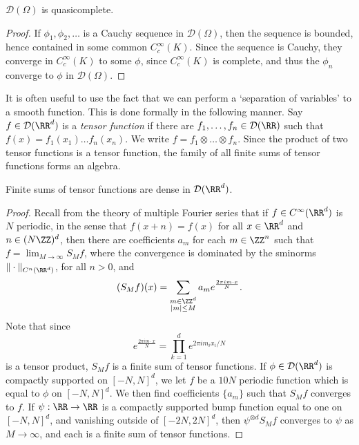\begin{corollary}
    $\mathcal{D}(\Omega)$ is quasicomplete.
\end{corollary}
\begin{proof}
    If $\phi_1, \phi_2, \dots$ is a Cauchy sequence in $\mathcal{D}(\Omega)$, then the sequence is bounded, hence contained in some common $C_c^\infty(K)$. Since the sequence is Cauchy, they converge in $C_c^\infty(K)$ to some $\phi$, since $C_c^\infty(K)$ is complete, and thus the $\phi_n$ converge to $\phi$ in $\mathcal{D}(\Omega)$.
\end{proof}

It is often useful to use the fact that we can perform a `separation of variables' to a smooth function. This is done formally in the following manner. Say $f \in \mathcal{D}(\RR^d)$ is a {\it tensor function} if there are $f_1, \dots, f_n \in \mathcal{D}(\RR)$ such that $f(x) = f_1(x_1) \dots f_n(x_n)$. We write $f = f_1 \otimes \dots \otimes f_n$. Since the product of two tensor functions is a tensor function, the family of all finite sums of tensor functions forms an algebra.

\begin{theorem}
    Finite sums of tensor functions are dense in $\mathcal{D}(\RR^d)$.
\end{theorem}
\begin{proof}
    Recall from the theory of multiple Fourier series that if $f \in C^\infty(\RR^d)$ is $N$ periodic, in the sense that $f(x + n) = f(x)$ for all $x \in \RR^d$ and $n \in (N \ZZ)^d$, then there are coefficients $a_m$ for each $m \in \ZZ^n$ such that $f = \lim_{M \to \infty} S_M f$, where the convergence is dominated by the sminorms $\| \cdot \|_{C^n(\RR^d)}$, for all $n > 0$, and
    \[ (S_M f)(x) = \sum_{\substack{m \in \ZZ^d\\|m| \leq M}} a_m e^{\frac{2 \pi i m \cdot x}{N}}. \]
    Note that since
    \[ e^{\frac{2 \pi i m \cdot x}{N}} = \prod_{k = 1}^d e^{2 \pi i m_ix_i/N} \]
    is a tensor product, $S_M f$ is a finite sum of tensor functions. If $\phi \in \mathcal{D}(\RR^d)$ is compactly supported on $[-N,N]^d$, we let $f$ be a $10N$ periodic function which is equal to $\phi$ on $[-N,N]^d$. We then find coefficients $\{ a_m \}$ such that $S_M f$ converges to $f$. If $\psi: \RR \to \RR$ is a compactly supported bump function equal to one on $[-N,N]^d$, and vanishing outside of $[-2N,2N]^d$, then $\psi^{\otimes d} S_M f$ converges to $\psi$ as $M \to \infty$, and each is a finite sum of tensor functions.
\end{proof}

